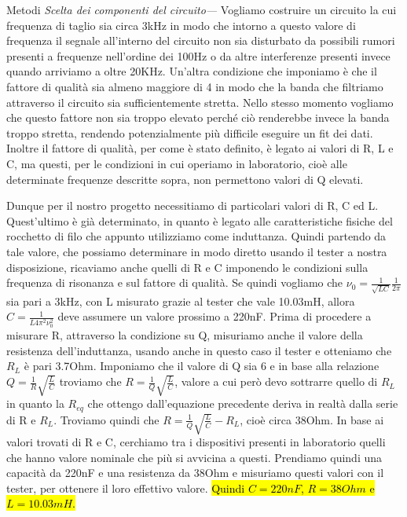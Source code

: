 \documentclass[
    rmp,
    floatfix,
    reprint, 
    superscriptaddress, 
    altaffilletter, 
    amsmath, 
    amssymb, 
    a4paper]{revtex4-2}
\begin{document}
\begin{methods}{Metodi}
    \noindent\textit{Scelta dei componenti del circuito---}\label{par:caratterizzazioneRLC} Vogliamo costruire un circuito la cui frequenza di taglio sia circa 3kHz in modo che intorno a questo valore di frequenza il segnale all'interno del circuito non sia disturbato da possibili rumori presenti a frequenze nell'ordine dei 100Hz o da altre interferenze presenti invece quando arriviamo a oltre 20KHz. Un'altra condizione che imponiamo è che il fattore di qualità sia almeno maggiore di 4 in modo che la banda che filtriamo attraverso il circuito sia sufficientemente stretta. Nello stesso momento vogliamo che questo fattore non sia troppo elevato perch\'e ci\`o renderebbe invece la banda troppo stretta, rendendo potenzialmente più difficile eseguire un fit dei dati. Inoltre il fattore di qualità, per come è stato definito, è legato ai valori di R, L e C, ma questi, per le condizioni in cui operiamo in laboratorio, cioè alle determinate frequenze descritte sopra, non permettono valori di Q elevati. 
    
    Dunque per il nostro progetto necessitiamo di particolari valori di R, C ed L. Quest'ultimo è già determinato, in quanto è legato alle caratteristiche fisiche del rocchetto di filo che appunto utilizziamo come induttanza. Quindi partendo da tale valore, che possiamo determinare in modo diretto usando il tester a nostra disposizione, ricaviamo anche quelli di R e C imponendo le condizioni sulla frequenza di risonanza e sul fattore di qualità. Se quindi vogliamo che $\nu_{0}=\frac{1}{\sqrt{LC}}\frac{1}{2\pi}$ sia pari a 3kHz, con L misurato grazie al tester che vale 10.03mH, allora $C=\frac{1}{L4\pi^2\nu_{0}^2}$ deve assumere un valore prossimo a 220nF. Prima di procedere a misurare R, attraverso la condizione su Q, misuriamo anche il valore della resistenza dell'induttanza, usando anche in questo caso il tester e otteniamo che $R_{L}$ è pari 3.7Ohm. Imponiamo che il valore di Q sia 6 e in base alla relazione $Q=\frac{1}{R}\sqrt{\frac{L}{C}}$ troviamo che $R=\frac{1}{Q}\sqrt{\frac{L}{C}}$, valore a cui però devo sottrarre quello di $R_{L}$ in quanto la $R_{eq}$ che ottengo dall'equazione precedente deriva in realtà dalla serie di R e $R_{L}$. Troviamo quindi che $R=\frac{1}{Q}\sqrt{\frac{L}{C}}-R_{L}$, cioè circa 38Ohm. In base ai valori trovati di R e C, cerchiamo tra i dispositivi presenti in laboratorio quelli che hanno valore nominale che più si avvicina a questi. Prendiamo quindi una capacità da 220nF e una resistenza da 38Ohm e misuriamo questi valori con il tester, per ottenere il loro effettivo valore. \hl{Quindi $C=220nF$, $R=38Ohm$ e $L=10.03mH$.}


\end{methods}
\end{document}
